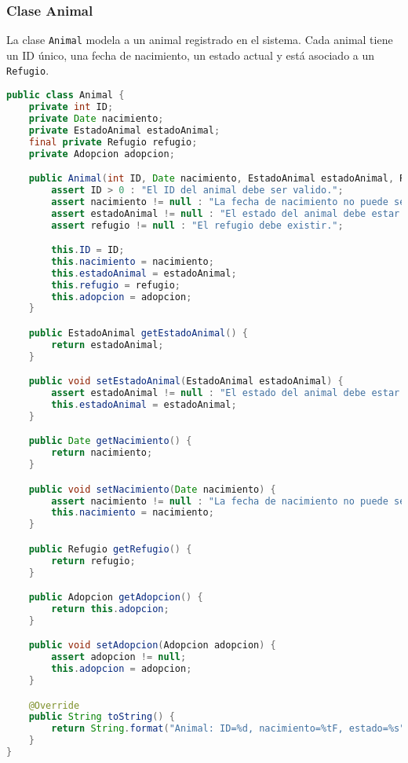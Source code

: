 \subsubsection{Clase Animal}
La clase \texttt{Animal} modela a un animal registrado en el sistema. Cada animal tiene un 
ID único, una fecha de nacimiento, un estado actual y está asociado a un \texttt{Refugio}.

\begin{lstlisting}[style = javaNormal, language=Java] 
public class Animal {
    private int ID;
    private Date nacimiento;
    private EstadoAnimal estadoAnimal;
    final private Refugio refugio;
    private Adopcion adopcion;

    public Animal(int ID, Date nacimiento, EstadoAnimal estadoAnimal, Refugio refugio, Adopcion adopcion) {
        assert ID > 0 : "El ID del animal debe ser valido.";
        assert nacimiento != null : "La fecha de nacimiento no puede ser nula.";
        assert estadoAnimal != null : "El estado del animal debe estar definido.";
        assert refugio != null : "El refugio debe existir.";

        this.ID = ID;
        this.nacimiento = nacimiento;
        this.estadoAnimal = estadoAnimal;
        this.refugio = refugio;
        this.adopcion = adopcion;
    }

    public EstadoAnimal getEstadoAnimal() {
        return estadoAnimal;
    }

    public void setEstadoAnimal(EstadoAnimal estadoAnimal) {
        assert estadoAnimal != null : "El estado del animal debe estar definido.";
        this.estadoAnimal = estadoAnimal;
    }

    public Date getNacimiento() {
        return nacimiento;
    }

    public void setNacimiento(Date nacimiento) {
        assert nacimiento != null : "La fecha de nacimiento no puede ser nula";
        this.nacimiento = nacimiento;
    }

    public Refugio getRefugio() {
        return refugio;
    }

    public Adopcion getAdopcion() {
        return this.adopcion;
    }

    public void setAdopcion(Adopcion adopcion) {
        assert adopcion != null;
        this.adopcion = adopcion;
    }

    @Override
    public String toString() {
        return String.format("Animal: ID=%d, nacimiento=%tF, estado=%s", ID, nacimiento, estadoAnimal);
    }
}
\end{lstlisting}

